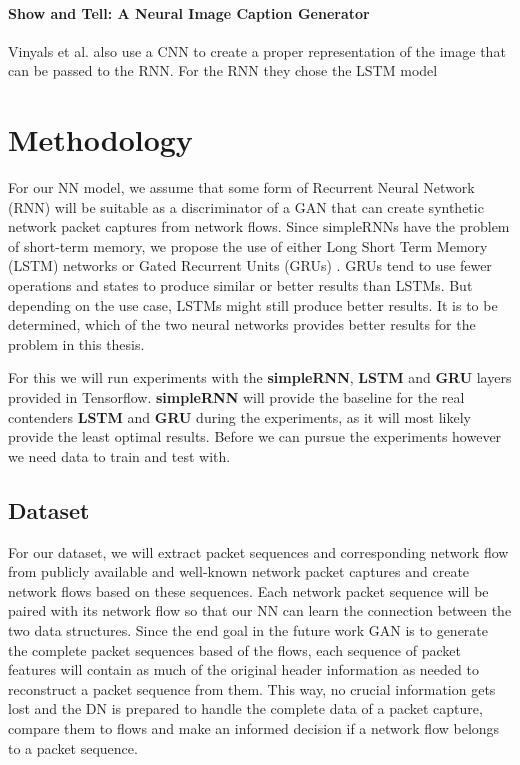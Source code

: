 \documentclass[
	ngerman,
	ruledheaders=section,%
	class=report,%
	thesis={type=bachelor},%
	accentcolor=9c,%
	custommargins=true,%
	marginpar=false,%
	parskip=half-,%
	fontsize=11pt,%
]{tudapub}
\begin{document}
\subsubsection{Show and Tell: A Neural Image Caption Generator} %
\label{sec:vinyals}

Vinyals et al. also use a CNN to create a proper representation of the image that can be passed to the RNN.
For the RNN they chose the LSTM model

\chapter{Methodology}
\label{sec:approach}
\label{sec:methodology}

For our NN model, we assume that some form of Recurrent Neural Network (RNN) will be suitable as a discriminator of a GAN that can create synthetic network packet captures from network flows.
Since simpleRNNs have the problem of short-term memory, we propose the use of either Long Short Term Memory (LSTM) networks \cite{hochreiterLongShortTermMemory1997} or Gated Recurrent Units (GRUs) \cite{bahdanauNeuralMachineTranslation2016}.
GRUs tend to use fewer operations and states to produce similar or better results than LSTMs.
But depending on the use case, LSTMs might still produce better results.
It is to be determined, which of the two neural networks provides better results for the problem in this thesis.

For this we will run experiments with the \textbf{simpleRNN}, \textbf{LSTM} and \textbf{GRU} layers provided in Tensorflow.
\textbf{simpleRNN} will provide the baseline for the real contenders \textbf{LSTM} and \textbf{GRU} during the experiments, as it will most likely provide the least optimal results.
Before we can pursue the experiments however we need data to train and test with.

\section{Dataset}
\label{sec:dataset}

For our dataset, we will extract packet sequences and corresponding network flow from publicly available and well-known network packet captures and create network flows based on these sequences.
Each network packet sequence will be paired with its network flow so that our NN can learn the connection between the two data structures.
Since the end goal in the future work GAN is to generate the complete packet sequences based of the flows,
each sequence of packet features will contain as much of the original header information as needed to reconstruct a packet sequence from them.
This way, no crucial information gets lost and the DN is prepared to handle the complete data of a packet capture, compare them to flows and make an informed decision if a network flow belongs to a packet sequence.
\end{document}
